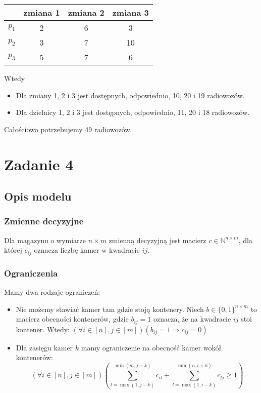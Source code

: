 \documentclass{article}
\begin{document}
\begin{center}
\begin{tabular}{| c | c | c | c |}
\hline
 & zmiana 1 & zmiana 2 & zmiana 3\\
 \hline
$p_1$ & 2 & 6 & 3\\
\hline
$p_2$ & 3 & 7 & 10 \\
\hline
$p_3$ & 5 & 7 & 6 \\
\hline
\end{tabular}
\end{center}
Wtedy
\begin{itemize}
\item Dla zmiany 1, 2 i 3 jest dostępnych, odpowiednio, 10, 20 i 19 radiowozów.
\item Dla dzielnicy 1, 2 i 3 jest dostępnych, odpowiednio, 11, 20 i 18 radiowozów.
\end{itemize}
Całościowo potrzebujemy 49 radiowozów. 

\section{Zadanie 4}
\subsection{Opis modelu}

\subsubsection{Zmienne decyzyjne}
Dla magazynu o wymiarze $n\times m$ zmienną decyzyjną jest macierz $c\in \mathbb{N}^{n\times m}$, dla której $c_{ij}$ oznacza liczbę kamer w kwadracie $ij$.
\subsubsection{Ograniczenia}
Mamy dwa rodzaje ograniczeń:
\begin{itemize}
\item Nie możemy stawiać kamer tam gdzie stoją kontenery. Niech $b\in \{0,1\}^{n\times m}$ to macierz obecności kontenerów, gdzie $b_{ij} = 1$ oznacza, że na kwadracie $ij$ stoi kontener. Wtedy:
$(\forall i\in [n], j\in[m])(b_{ij} = 1 \Rightarrow c_{ij} = 0)$
\item Dla zasięgu kamer $k$ mamy ograniczenie na obecność kamer wokół kontenerów:
$$(\forall i\in [n], j\in[m])\left(\sum_{l=\max(1, j-k)}^{ \min(m, j+k)}c_{il} + 
\sum_{l=\max(1, i-k)}^{ \min(n, i+k) }c_{lj}\geq 1 \right)$$
\end{itemize}
\end{document}
